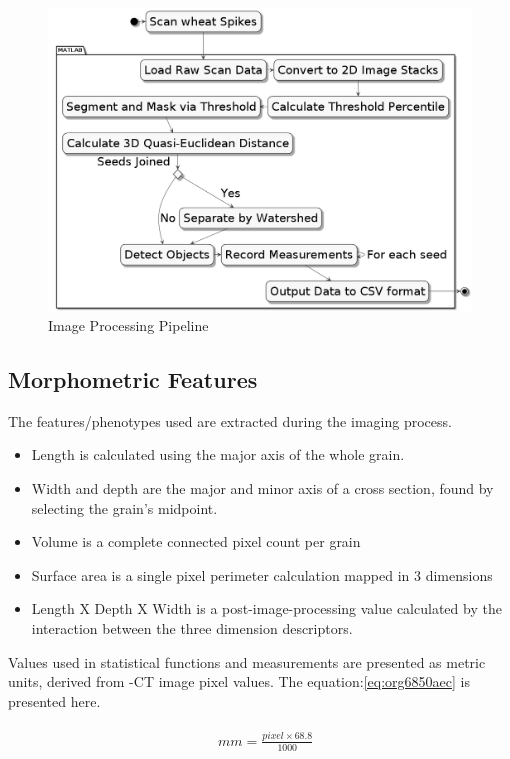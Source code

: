 \documentclass[11pt]{report}
\begin{document}
\begin{figure}[htbp]
\centering
\includegraphics[width=15cm]{./images/matlab.png}
\caption{\label{fig:org3939087}
Image Processing Pipeline}
\end{figure}

\subsection{Morphometric Features}
\label{sec:org9f3218e}

The features/phenotypes used are extracted during the imaging process.
\begin{itemize}
\item Length is calculated using the major axis of the whole grain.
\item Width and depth are the major and minor axis of a cross section, found by selecting the grain's midpoint.
\item Volume is a complete connected pixel count per grain
\item Surface area is a single pixel perimeter calculation mapped in 3 dimensions
\item Length X Depth X Width is a post-image-processing value calculated by the interaction between the three dimension descriptors.
\end{itemize}

Values used in statistical functions and measurements are presented as metric units, derived from \textmu{}-CT image pixel values. The equation:\ref{eq:org6850aec} is presented here.

\begin{align}
\label{eq:org6850aec}
  &\begin{aligned}
mm = \frac{pixel \times 68.8}{1000}
  \end{aligned}
\end{align}
\end{document}
